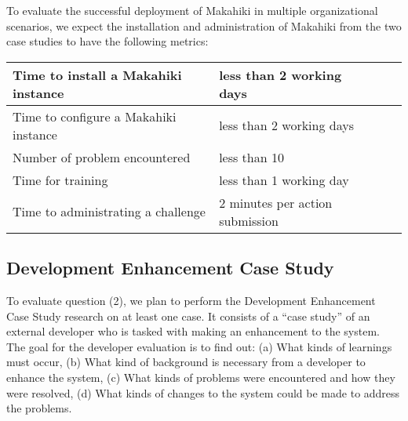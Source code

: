 \documentclass[11pt]{article}
\begin{document}
To evaluate the successful deployment of Makahiki in multiple organizational scenarios, we expect the installation and administration of Makahiki from the two case studies to have the following metrics:
\begin{center}
    \begin{tabular}{ | l | l | l | l |}
    \hline
    Time to install a Makahiki instance & less than 2 working days \\ \hline
    Time to configure a Makahiki instance & less than 2 working days \\ \hline
    Number of problem encountered & less than 10 \\ \hline
    Time for training & less than 1 working day \\ \hline
    Time to administrating a challenge & 2 minutes per action submission \\ \hline
    \end{tabular}
\end{center}

\subsection{Development Enhancement Case Study}
To evaluate question (2), we plan to perform the Development Enhancement Case Study research on at least one case. It consists of a ``case study'' of an external developer who is tasked with making an enhancement to the system.  The goal for the developer evaluation is to find out: (a) What kinds of learnings must occur, (b) What kind of background is necessary from a developer to enhance the system, (c) What kinds of problems were encountered and how they were resolved, (d) What kinds of changes to the system could be made to address the problems.
\end{document}
